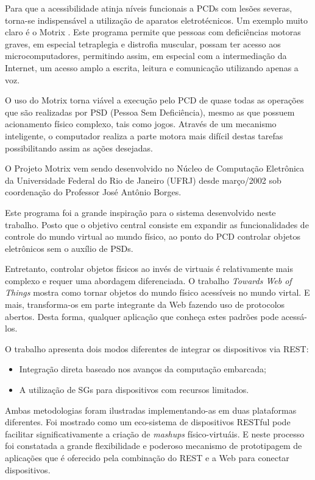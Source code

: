 \documentclass[12pt,a4paper,oneside]{report}
\begin{document}
Para que a acessibilidade atinja níveis funcionais a PCDs com lesões severas, torna-se indispensável a utilização de aparatos eletrotécnicos. Um exemplo muito claro é o Motrix \cite{motrix}. Este programa permite que pessoas com deficiências motoras graves, em especial tetraplegia e distrofia muscular, possam ter acesso aos microcomputadores, permitindo assim, em especial com a intermediação da Internet, um acesso amplo a escrita, leitura e comunicação utilizando apenas a voz.

O uso do Motrix torna viável a execução pelo PCD de quase todas as operações que são realizadas por PSD (Pessoa Sem Deficiência), mesmo as que possuem acionamento físico complexo, tais como jogos. Através de um mecanismo inteligente, o computador realiza a parte motora mais difícil destas tarefas possibilitando assim as ações desejadas.

O Projeto Motrix vem sendo desenvolvido no Núcleo de Computação Eletrônica da Universidade Federal do Rio de Janeiro (UFRJ) desde março/2002 sob coordenação do Professor José Antônio Borges.

Este programa foi a grande inspiração para o sistema desenvolvido neste trabalho. Posto que o objetivo central consiste em expandir as funcionalidades de controle do mundo virtual ao mundo físico, ao ponto do PCD controlar objetos eletrônicos sem o auxílio de PSDs.

Entretanto, controlar objetos físicos ao invés de virtuais é relativamente mais complexo e requer uma abordagem diferenciada. O trabalho \emph{Towards Web of Things} \cite{wotdovad} mostra como tornar objetos do mundo físico acessíveis no mundo virtal. E mais, transforma-os em parte integrante da Web fazendo uso de protocolos abertos. Desta forma, qualquer aplicação que conheça estes padrões pode acessá-los.

O trabalho apresenta dois modos diferentes de integrar os dispositivos via REST:
\begin{itemize}
	\item Integração direta baseado nos avanços da computação embarcada;
	\item A utilização de SGs para dispositivos com recursos limitados.
\end{itemize}

Ambas metodologias foram ilustradas implementando-as em duas plataformas diferentes. Foi mostrado como um eco-sistema de dispositivos RESTful pode facilitar significativamente a criação de \emph{mashups} físico-virtuáis. E neste processo foi constatada a grande flexibilidade e poderoso mecanismo de prototipagem de aplicações que é oferecido pela combinação do REST e a Web para conectar dispositivos.
\end{document}
